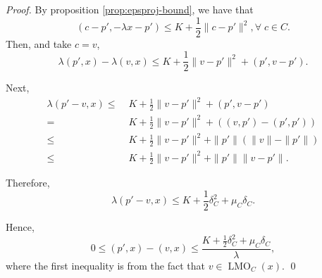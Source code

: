 \documentclass[smallextended]{svjour3}
\newcommand{\lmo}{\operatorname{LMO}}
\newcommand{\scal}[2]{{({{#1},{#2}})}}
\begin{document}
\begin{proof}
    By proposition \ref{prop:epsproj-bound}, we have that
    \[\scal{c - p'}{-\lambda x - p'} \leq K + \frac{1}{2} \|c - p'\|^2, \forall \; c \in C.\]
    Then, and take $c = v$,
    \[\lambda\scal{p'}{x} - \lambda\scal{v}{x} \leq K + \frac{1}{2} \|v - p'\|^2 + \scal{p'}{v - p'}.\]

    Next,
    \[
    \begin{aligned}
        \lambda\scal{p' - v}{x} \leq&\; K + \frac{1}{2} \|v - p'\|^2+ \scal{p'}{v - p'}\\
        =&\; K +\frac{1}{2} \|v - p'\|^2+ (\scal{v}{p'} - \scal{p'}{p'})\\
        \leq&\; K + \frac{1}{2} \|v - p'\|^2+\|p'\|(\|v\| - \|p'\|)\\
        \leq&\; K + \frac{1}{2} \|v - p'\|^2+\|p'\| \|v - p'\|.
    \end{aligned}
    \]

    Therefore, 
    \[\lambda\scal{p' - v}{x} \leq K + \frac{1}{2}\delta_C^2 +  \mu_C\delta_C.\]

    Hence,
    \[0 \leq \scal{p'}{x} - \scal{v}{x} \leq \frac{K + \frac{1}{2} \delta_C^2 + \mu_C \delta_C}{\lambda},\]
    where the first inequality is from the fact that $v \in \lmo_C(x)$.
    \qed
\end{proof}





\end{document}
